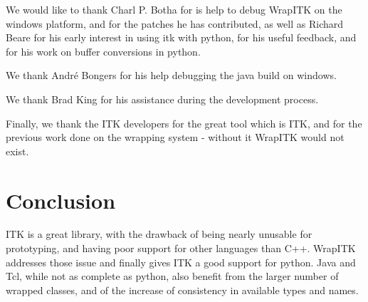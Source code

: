 \documentclass{InsightArticle}
\begin{document}
We would like to thank Charl P. Botha for is help to debug WrapITK on the windows
platform, and for the patches he has contributed, as well as Richard Beare for
his early interest in using itk with python, for his useful feedback, and for
his work on buffer conversions in python.

We thank Andr\'e Bongers for his help debugging the java build on windows.

We thank Brad King for his assistance during the development process.

Finally, we thank the ITK developers for the great tool which is ITK, and for the
previous work done on the wrapping system - without it WrapITK would not exist.


\newpage
\part{Conclusion}

ITK is a great library, with the drawback of being nearly unusable for prototyping,
and having poor support for other languages than C++. WrapITK addresses those
issue and finally gives ITK a good support for python. Java and Tcl, while
not as complete as python, also benefit from the larger number of
wrapped classes, and of the increase of consistency in available types and names.



\newpage
\appendix





\nocite{ITKSoftwareGuide}
\end{document}
